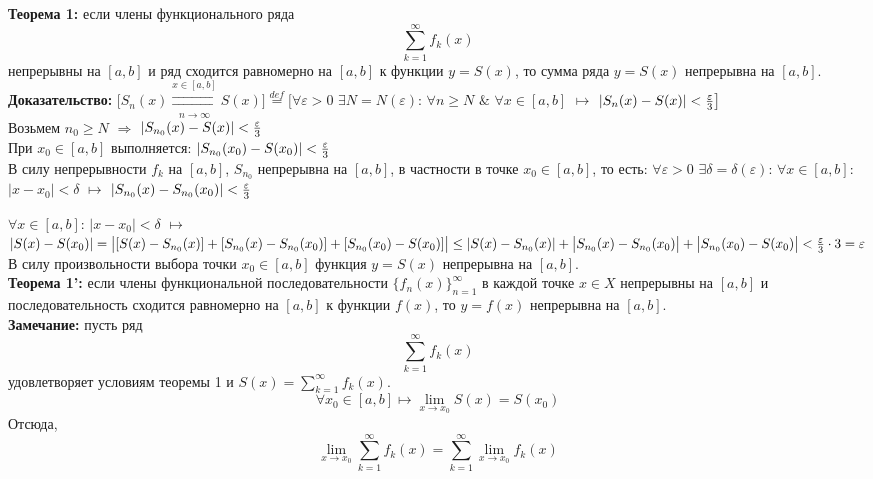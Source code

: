 \documentclass[a4paper,12pt]{article} %
\begin{document}
\noindent \textbf{Теорема 1:} если члены функционального ряда $$\sum_{k = 1}^{\infty}  f_k(x)$$   непрерывны на $[a,b]$ и ряд сходится равномерно на $[a,b]$ к функции $y = S(x)$, то сумма ряда 
$y = S(x)$ непрерывна на $[a,b]$. 
\\[5 mm]
\noindent \textbf{Доказательство:} \newline
$\big[S_n(x) \overset{x \in [a,b]}{\underset{n \rightarrow \infty}{\rightrightarrows}} S(x)\big]\stackrel{def}{=} \big[ \forall \varepsilon > 0 $  $\exists N = N(\varepsilon)$: $\forall n \geq N$  $\&$  $\forall x \in [a,b]$ $\longmapsto$ $|S_n(x) -S(x)| < {\varepsilon \over 3} \big]$
\\[5 mm]
Возьмем $n_0 \geq N$ $\Rightarrow$ $|S_{n_0}(x)-S(x)| < {\varepsilon \over 3}$ \\[5 mm]
При $x_0 \in [a,b]$ выполняется: \newline
$|S_{n_0}(x_0)-S(x_0)| < {\varepsilon \over 3}$
\\[5 mm]
В силу непрерывности $f_k$ на $[a,b]$, $S_{n_0}$ непрерывна на $[a,b]$, в частности в точке $x_0 \in [a,b]$, то есть: \newline
$\forall \varepsilon > 0$ $\exists \delta = \delta(\varepsilon)$: $\forall x \in [a,b]$:  $|x-x_0|<\delta$ $\longmapsto$ $|S_{n_0}(x) - S_{n_0}(x_0)| < {\varepsilon \over 3}$
\newline

$\forall x \in [a,b]$: $|x-x_0|<\delta$ $\longmapsto$ 
\newline \newline
$|S(x) - S(x_0)| = \big| [S(x)-S_{n_0}(x)] + [S_{n_0}(x)-S_{n_0}(x_0)] + [S_{n_0}(x_0)-S(x_0)]\big| \leq |S(x)-S_{n_0}(x)| + \big| S_{n_0}(x)-S_{n_0}(x_0)\big| + \big|S_{n_0}(x_0) - S(x_0)\big| < {\varepsilon \over 3} \cdot 3 = \varepsilon$
\\[5 mm]
 В силу произвольности выбора точки $x_0 \in [a,b]$ функция $y = S(x)$ непрерывна на $[a,b]$.
\\[5 mm]
\noindent \textbf{Теорема 1':} если члены функциональной последовательности $\{f_n(x)\}_{n=1}^\infty$ в каждой точке $x \in X$  непрерывны на $[a,b]$ и последовательность сходится равномерно на $[a,b]$ к функции $f(x)$, то $y = f(x)$ непрерывна на $[a,b]$. 
\\[5 mm]
\noindent \textbf{Замечание:} пусть ряд $$\sum_{k = 1}^{\infty}  f_k(x)$$ удовлетворяет условиям теоремы 1 и $S(x)=\sum\limits_{k = 1}^{\infty}  f_k(x)$.
\newline 
$$\forall x_0 \in [a,b] \longmapsto \lim_{x\rightarrow x_0} S(x) = S(x_0)$$ \newline
Отсюда, $$\lim_{x\rightarrow x_0} \sum_{k = 1}^{\infty}  f_k(x) = \sum_{k = 1}^{\infty}  \lim_{x\rightarrow x_0}f_k(x) $$
\end{document}
